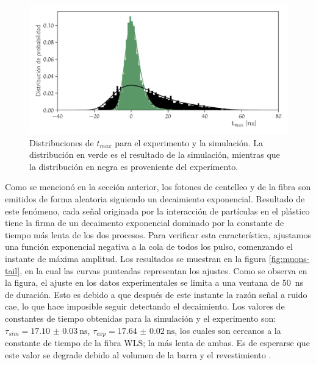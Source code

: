 \begin{figure}
        \centering
        \includegraphics[width=\textwidth]{tmax_dist.pdf}
        \caption{Distribuciones de $t_{max}$ para el experimento y la simulación. La distribución en verde es el resultado de la simulación, mientras que la distribución en negra es proveniente del experimento.}
        \label{fig:tmax}
\end{figure}

Como se mencionó en la sección anterior, los fotones de centelleo y de la fibra son emitidos de forma aleatoria siguiendo un decaimiento exponencial. Resultado de este fenómeno, cada señal originada por la interacción de partículas en el plástico tiene la firma de un decaimento exponencial dominado por la constante de tiempo más lenta de los dos procesos. Para verificar esta característica, ajustamos una función exponencial negativa a la cola de todos los pulso, comenzando el instante de máxima amplitud. Los resultados se muestran en la figura \ref{fig:muons-tail}, en la cual las curvas punteadas representan los ajustes. Como se observa en la figura, el ajuste en los datos experimentales se limita a una ventana de \SI{50}{\ns} de duración. Esto es debido a que después de este instante la razón señal a ruido cae, lo que hace imposible seguir detectando el decaimiento. Los valores de constantes de tiempo obtenidas para la simulación y el experimento son: $\tau_{sim}=\SI{17.10(3)}{\ns}$, $\tau_{exp}=\SI{17.64(2)}{\ns}$, los cuales son cercanos a la constante de tiempo de la fibra WLS; la más lenta de ambas. Es de esperarse que este valor se degrade debido al volumen de la barra y el revestimiento \cite{gros18}.

